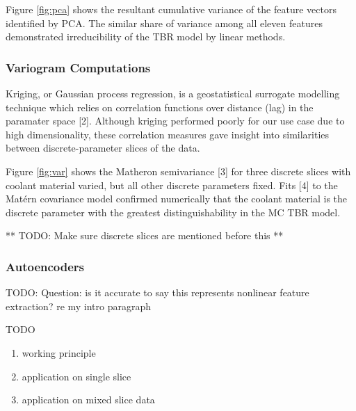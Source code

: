 Figure \ref{fig:pca} shows the resultant cumulative variance of the feature vectors identified by PCA. The similar share of variance among all eleven features demonstrated irreducibility of the TBR model by linear methods.

\subsubsection{Variogram Computations}

Kriging, or Gaussian process regression, is a geostatistical surrogate modelling technique which relies on correlation functions over distance (lag) in the paramater space [2]. Although kriging performed poorly for our use case due to high dimensionality, these correlation measures gave insight into similarities between discrete-parameter slices of the data.

Figure \ref{fig:var} shows the Matheron semivariance [3] for three discrete slices with coolant material varied, but all other discrete parameters fixed. Fits [4] to the Matérn covariance model confirmed numerically that the coolant material is the discrete parameter with the greatest distinguishability in the MC TBR model. 


** TODO: Make sure discrete slices are mentioned before this **

\subsubsection{Autoencoders}

TODO: Question: is it accurate to say this represents nonlinear feature extraction? re my intro paragraph

TODO
\begin{enumerate}
	\item working principle
	\item application on single slice
	\item application on mixed slice data
\end{enumerate}


